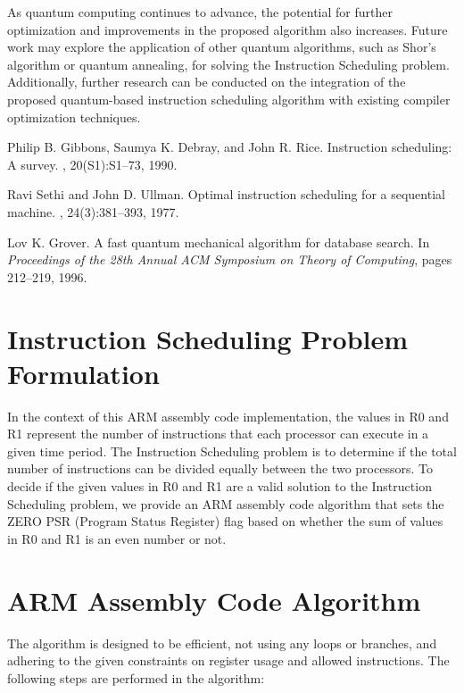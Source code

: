 As quantum computing continues to advance, the potential for further optimization and improvements in the proposed algorithm also increases. Future work may explore the application of other quantum algorithms, such as Shor's algorithm or quantum annealing, for solving the Instruction Scheduling problem. Additionally, further research can be conducted on the integration of the proposed quantum-based instruction scheduling algorithm with existing compiler optimization techniques.

\begin{thebibliography}{9}

Philip B. Gibbons, Saumya K. Debray, and  John R. Rice.
\newblock Instruction scheduling: A survey.
, 20(S1):S1--73, 1990.

Ravi Sethi and John D. Ullman.
\newblock Optimal instruction scheduling for a sequential machine.
, 24(3):381--393, 1977.

Lov K. Grover.
\newblock A fast quantum mechanical algorithm for database search.
\newblock In {\em Proceedings of the 28th Annual ACM Symposium on Theory of Computing}, pages 212--219, 1996.

\end{thebibliography}

\section{Instruction Scheduling Problem Formulation}

In the context of this ARM assembly code implementation, the values in R0 and R1 represent the number of instructions that each processor can execute in a given time period. The Instruction Scheduling problem is to determine if the total number of instructions can be divided equally between the two processors. To decide if the given values in R0 and R1 are a valid solution to the Instruction Scheduling problem, we provide an ARM assembly code algorithm that sets the ZERO PSR (Program Status Register) flag based on whether the sum of values in R0 and R1 is an even number or not.

\section{ARM Assembly Code Algorithm}

The algorithm is designed to be efficient, not using any loops or branches, and adhering to the given constraints on register usage and allowed instructions. The following steps are performed in the algorithm:

